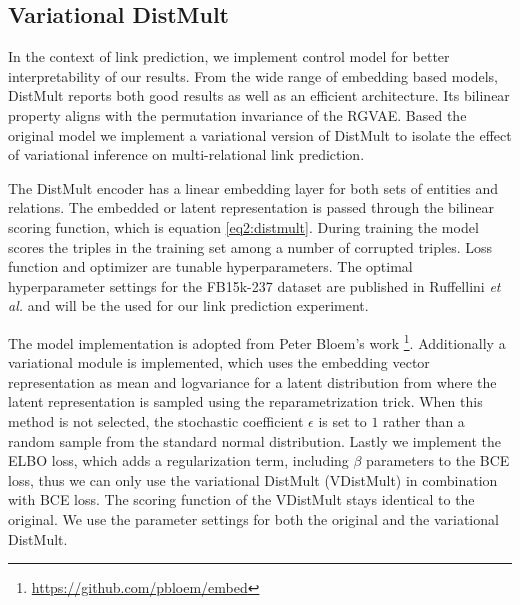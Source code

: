 \subsection{Variational DistMult}
\label{ssec4:vdistm}

In the context of link prediction, we implement control model for better interpretability of our results. From the wide range of embedding based models, DistMult reports both good results as well as an efficient architecture. Its bilinear property aligns with the permutation invariance of the RGVAE. Based the original model we implement a variational version of DistMult to isolate the effect of variational inference on multi-relational link prediction.

The DistMult encoder has a linear embedding layer for both sets of entities and relations. The embedded or latent representation is passed through the bilinear scoring function, which is equation \ref{eq2:distmult}. During training the model scores the triples in the training set among a number of corrupted triples. Loss function and optimizer are tunable hyperparameters. The optimal hyperparameter settings for the FB15k-237 dataset are published in Ruffellini \textit{et al.} \cite{ruffinelli_you_2019} and will be the used for our link prediction experiment.

The model implementation is adopted from Peter Bloem's work \footnote{\url{https://github.com/pbloem/embed}}. Additionally a variational module is implemented, which uses the embedding vector representation as mean and logvariance for a latent distribution from where the latent representation is sampled using the reparametrization trick. When this method is not selected, the stochastic coefficient $\epsilon$ is set to $1$ rather than a random sample from the standard normal distribution. Lastly we implement the ELBO loss, which adds a regularization term, including $\beta$ parameters to the BCE loss, thus we can only use the variational DistMult (VDistMult) in combination with BCE loss. The scoring function of the VDistMult stays identical to the original. We use the parameter settings for both the original and the variational DistMult. 



